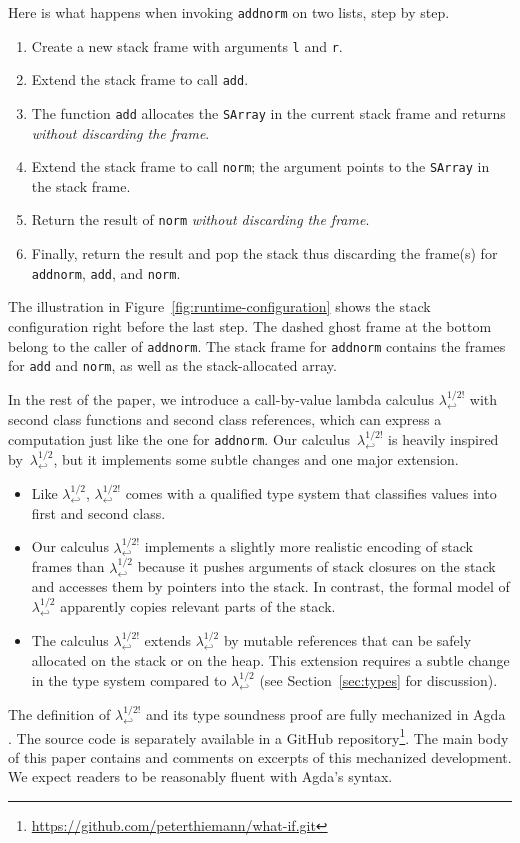 \documentclass[sigplan,review,dvipsnames,screen,10pt]{acmart}
\newcommand{\LamWhatif}{\ensuremath{\lambda^{1/2}_{\hookleftarrow}}}
\newcommand{\LamOurs}{\ensuremath{\lambda^{1/2!}_{\hookleftarrow}}}
\begin{document}
Here is what happens when invoking \texttt{addnorm} on two lists, step by step.
\begin{enumerate}
\item Create a new stack frame with arguments \lstinline|l| and
  \lstinline|r|.
\item Extend the stack frame to call \texttt{add}.
\item The function \texttt{add} allocates the
  \texttt{SArray} in the current stack frame and returns
  \emph{without discarding the frame}.
\item Extend the stack frame to call \texttt{norm}; the argument
  points to the \texttt{SArray} in the stack frame.
\item Return the result of \texttt{norm} \emph{without discarding the
    frame}.
\item Finally, return the result and pop the stack thus discarding the frame(s) for
  \texttt{addnorm}, \texttt{add}, and \texttt{norm}.
\end{enumerate}
The illustration in Figure~\ref{fig:runtime-configuration} shows the
stack configuration right before the last step. The dashed ghost frame
at the bottom belong to the caller of \texttt{addnorm}. The stack
frame for \texttt{addnorm} contains the frames for \texttt{add} and
\texttt{norm}, as well as the stack-allocated array.

In the rest of the paper, we introduce a call-by-value lambda calculus $\LamOurs$
with second class functions and second class references, which can
express a computation just like the one for \texttt{addnorm}. Our
calculus~$\LamOurs$ is heavily inspired by~$\LamWhatif$, but it
implements some subtle changes and one major extension.

\begin{itemize}
\item Like $\LamWhatif$, $\LamOurs$ comes with a qualified type system
  that classifies values into first and second class.
\item Our calculus $\LamOurs$ implements a slightly more realistic encoding of stack frames
  than $\LamWhatif$ because it pushes arguments of stack closures on
  the stack and accesses them by pointers into the stack. In contrast, the formal model of
  $\LamWhatif$ apparently copies relevant parts of the stack.
\item The calculus $\LamOurs$ extends $\LamWhatif$ by mutable references that can
  be safely allocated on the stack or on the heap. This extension
  requires a subtle change in the type system compared to $\LamWhatif$
  (see Section~\ref{sec:types} for discussion). 
\end{itemize}
The definition of $\LamOurs$ and its type soundness proof are fully
mechanized in Agda
\cite{DBLP:conf/afp/Norell08,team25:_agda_homep}. The source code is
separately available in a GitHub
repository\footnote{\url{https://github.com/peterthiemann/what-if.git}}. 
The main body of this paper contains and comments on excerpts of this
mechanized development. We expect readers to be reasonably fluent with
Agda's syntax. 
\end{document}
